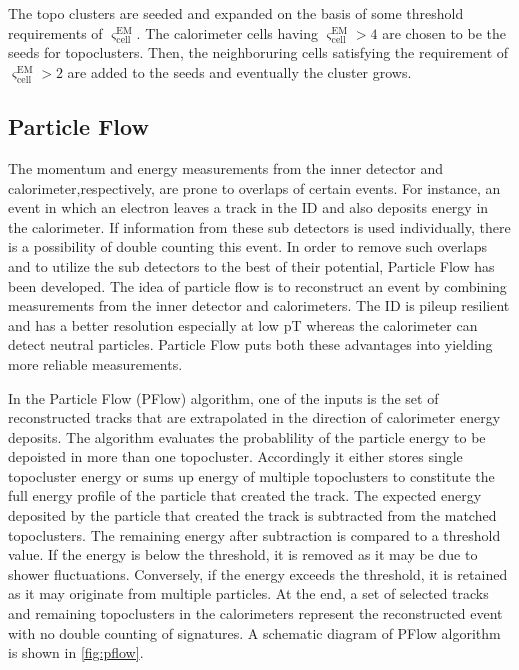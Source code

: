 The topo clusters are seeded and expanded on the basis of some threshold requirements of $\varsigma_{\text{cell}}^{\text{EM}}$. 
The calorimeter cells having $\varsigma_{\text{cell}}^{\text{EM}}>4$ are chosen to be the seeds for topoclusters. Then, the 
neighboruring cells satisfying the requirement of $\varsigma_{\text{cell}}^{\text{EM}}>2$ are added to the seeds and eventually the
cluster grows.

\subsection{Particle Flow}
\label{sec:pflow}
The momentum and energy measurements from the inner detector and calorimeter,respectively, are prone
to overlaps of certain events. For instance, an event in which an electron leaves a track in the ID and also
deposits energy in the calorimeter. If information from these sub detectors is used individually, there is a
possibility of double counting this event. In order to remove such overlaps and to utilize the sub detectors to
the best of their potential, Particle Flow has been developed. The idea of particle flow is to reconstruct an
event by combining measurements from the inner detector and calorimeters. The ID is pileup resilient and
has a better resolution especially at low pT whereas the calorimeter can detect neutral particles. Particle
Flow puts both these advantages into yielding more reliable measurements.

In the Particle Flow (PFlow) algorithm, one of the inputs is the set of reconstructed tracks that are extrapolated
in the direction of calorimeter energy deposits. The algorithm evaluates the probablility of the particle
energy to be depoisted in more than one topocluster. Accordingly it either stores single topocluster energy
or sums up energy of multiple topoclusters to constitute the full energy profile of the particle that created the
track. The expected energy deposited by the particle that created the track is subtracted from the matched
topoclusters. The remaining energy after subtraction is compared to a threshold value. If the energy is below the 
threshold, it is removed as it may be due to shower fluctuations. Conversely, if the energy exceeds the threshold, 
it is retained as it may originate from multiple particles. At the end, a set of selected tracks and remaining
topoclusters in the calorimeters represent the reconstructed event with no double counting of signatures. A schematic 
diagram of PFlow algorithm is shown in \cref{fig:pflow}.

